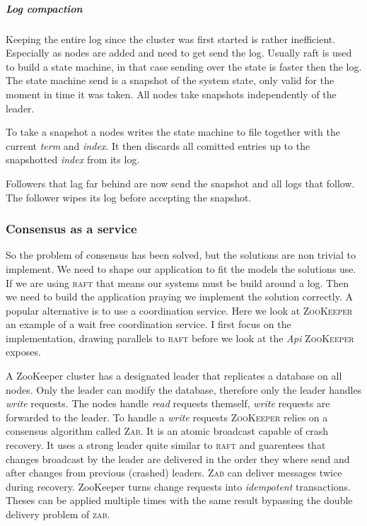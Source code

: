 \subparagraph{Log compaction} \label{par:logcomp}
Keeping the entire log since the cluster was first started is rather inefficient. Especially as nodes are added and need to get send the log. Usually raft is used to build a state machine, in that case sending over the state is faster then the log. The state machine send is a snapshot of the system state, only valid for the moment in time it was taken. All nodes take snapshots independently of the leader. 

To take a snapshot a nodes writes the state machine to file together with the current \textit{term} and \textit{index}. It then discards all comitted entries up to the snapshotted \textit{index} from its log. 

Followers that lag far behind are now send the snapshot and all logs that follow. The follower wipes its log before accepting the snapshot.

\subsubsection*{Consensus as a service}
So the problem of consensus has been solved, but the solutions are non trivial to implement. We need to shape our application to fit the models the solutions use. If we are using \textsc{raft} that means our systems must be build around a log. Then we need to build the application praying we implement the solution correctly. A popular alternative is to use a coordination service. Here we look at \textsc{ZooKeeper}\cite{zookeeper} an example of a wait free coordination service. I first focus on the implementation, drawing parallels to \textsc{raft} before we look at the \textit{Api} \textsc{ZooKeeper} exposes.

A ZooKeeper cluster has a designated leader that replicates a database on all nodes. Only the leader can modify the database, therefore only the leader handles \textit{write} requests. The nodes handle \textit{read} requests themself, \textit{write} requests are forwarded to the leader. To handle a \textit{write} requests \textsc{ZooKeeper} relies on a consensus algorithm called \textsc{Zab}\cite{zab}. It is an atomic broadcast capable of crash recovery. It uses a strong leader quite similar to \textsc{raft} and guarentees that changes broadcast by the leader are delivered in the order they where send and after changes from previous (crashed) leaders. \textsc{Zab} can deliver messages twice during recovery. ZooKeeper turns change requests into \textit{idempotent} transactions. Theses can be applied multiple times with the same result bypassing the double delivery problem of \textsc{zab}.

